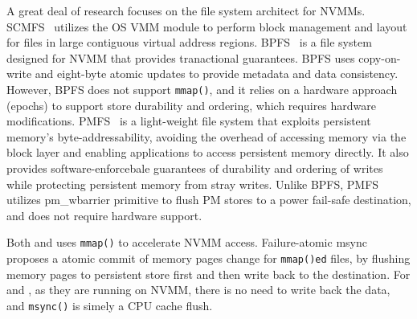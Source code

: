 A great deal of research focuses on the file system architect for NVMMs.
SCMFS~\cite{scmfs} utilizes the OS VMM module to perform  block
management and layout for files in large contiguous virtual address regions.
BPFS~\cite{BPFS} is a file system designed for NVMM that provides
tranactional guarantees. BPFS uses copy-on-write and eight-byte 
atomic updates to provide metadata and data consistency. However, BPFS does
not support \texttt{mmap()}, and it relies on a hardware approach (epochs)
to support store durability and ordering, which requires hardware
modifications.  PMFS~\cite{PMFS} is a light-weight
file system that exploits persistent memory's byte-addressability, avoiding the
overhead of accessing memory via the block layer and enabling applications to
access persistent memory directly.  It also provides software-enforcebale guarantees of durability
and ordering of writes while protecting persistent memory from stray writes.
Unlike BPFS, PMFS utilizes pm\_wbarrier primitive to flush PM stores to a power
fail-safe destination, and does not require hardware support.


Both \DAChell{} and \CChell uses \texttt{mmap()} to accelerate NVMM access.
Failure-atomic msync~\cite{atomicmsync} proposes a atomic commit of memory
pages change for \texttt{mmap()ed} files, by flushing memory pages to persistent
store first and then write back to the destination. For \DAChell{} and \CChell{}, as they are running on NVMM, there is no need to write back the data, and
\texttt{msync()} is simely a CPU cache flush.

\begin{comment}
We see two potential future improvements for \Chell{}. First, we hope to improve
it by adding
strong consistency and protection from malicious writes. Second, at present 
\Chell{} cannot avoid
\texttt{memcpy()} entirely, because POSIX APIs provide user buffers to fill with
data. If we modify the POSIX interfaces that return cache pages to applications
directly we can eliminate \texttt{memcpy}.
\end{comment}
